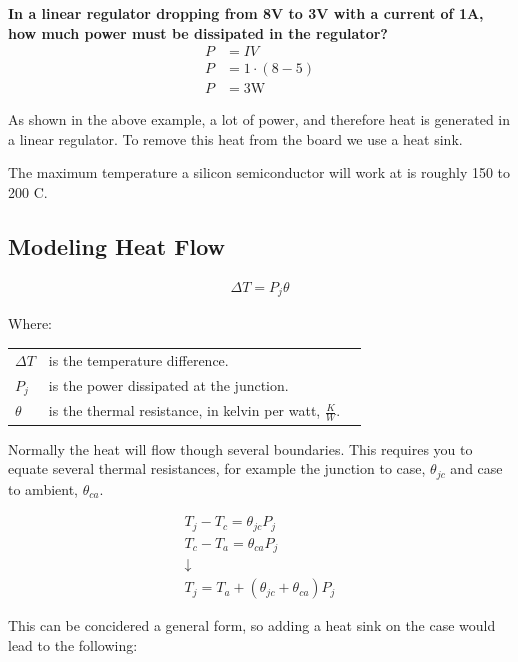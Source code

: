 \begin{framed}
\textbf{In a linear regulator dropping from 8V to 3V with a current of 1A, how much power must be dissipated in the regulator?}
\begin{align*}
P &= IV \\
P &= 1\cdot(8-5) \\
P &= 3\textrm{W}
\end{align*}
\end{framed}

As shown in the above example, a lot of power, and therefore heat is generated in a linear regulator. To remove this heat from the board we use a heat sink.

The maximum temperature a silicon semiconductor will work at is roughly 150 to 200 \degree C.

\subsection{Modeling Heat Flow}

\begin{align*}
\Delta T = P_j \theta
\end{align*}

Where:

\begin{table}[H]
	\centering
    \begin{tabular}{lll}
    $\Delta T$ & is the temperature difference. \\
    $P_j$      & is the power dissipated at the junction. \\
    $\theta$   & is the thermal resistance, in kelvin per watt, $\frac{K}{W}$. \\
    \end{tabular}
\end{table}

Normally the heat will flow though several boundaries. This requires you to equate several thermal resistances, for example the junction to case, $\theta_{jc}$ and case to ambient, $\theta_{ca}$.

\begin{gather*}
T_j - T_c = \theta_{jc}P_j \\
T_c - T_a = \theta_{ca}P_j \\
\downarrow \\
T_j = T_a + (\theta_{jc} + \theta_{ca})P_j
\end{gather*}

This can be concidered a general form, so adding a heat sink on the case would lead to the following:

